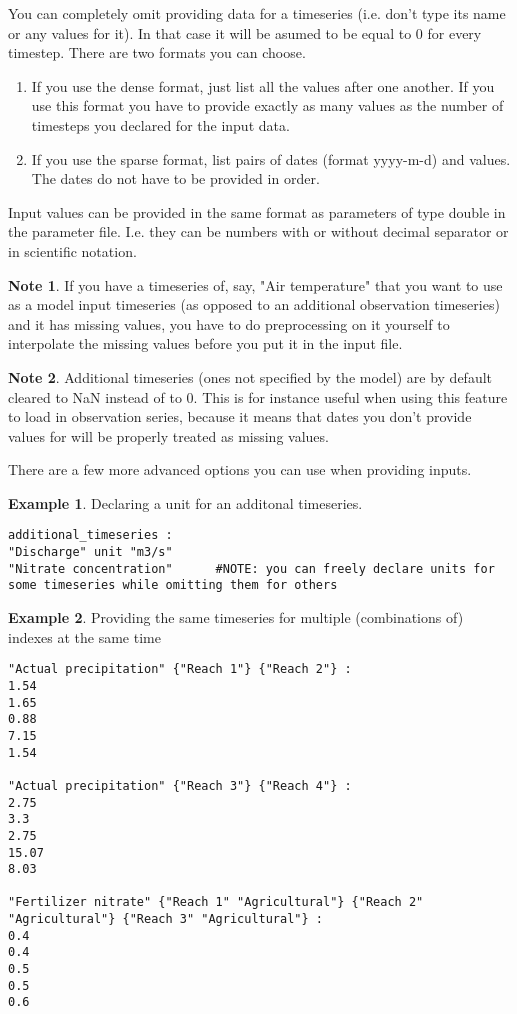 \documentclass[11pt]{article}
\theoremstyle{definition}
\newtheorem{mynote}{Note}
\newenvironment{note}%
  {\begin{lrbox}{\notebox}%
   \begin{minipage}{\dimexpr\linewidth-2\fboxsep}
   \begin{mynote}}%
  {\end{mynote}%
   \end{minipage}%
   \end{lrbox}%
   \begin{trivlist}
     \item[]\colorbox{silver}{\usebox\notebox}
   \end{trivlist}}
\newtheorem{myexample}{Example}
\newenvironment{example}%
  {\begin{lrbox}{\examplebox}%
   \begin{minipage}{\dimexpr\linewidth-2\fboxsep}
   \begin{myexample}}%
  {\end{myexample}%
   \end{minipage}%
   \end{lrbox}%
   \begin{trivlist}
     \item[]\colorbox{silver}{\usebox\examplebox}
   \end{trivlist}}
\begin{document}
You can completely omit providing data for a timeseries (i.e. don't type its name or any values for it). In that case it will be asumed to be equal to 0 for every timestep. There are two formats you can choose.
\begin{enumerate}[i]
\item If you use the dense format, just list all the values after one another. If you use this format you have to provide exactly as many values as the number of timesteps you declared for the input data.
\item If you use the sparse format, list pairs of dates (format yyyy-m-d) and values. The dates do not have to be provided in order.
\end{enumerate}
Input values can be provided in the same format as parameters of type double in the parameter file. I.e. they can be numbers with or without decimal separator or in scientific notation.

\begin{note}
If you have a timeseries of, say, "Air temperature" that you want to use as a model input timeseries (as opposed to an additional observation timeseries) and it has missing values, you have to do preprocessing on it yourself to interpolate the missing values before you put it in the input file.
\end{note}

\begin{note}
Additional timeseries (ones not specified by the model) are by default cleared to NaN instead of to 0. This is for instance useful when using this feature to load in observation series, because it means that dates you don't provide values for will be properly treated as missing values.
\end{note}

There are a few more advanced options you can use when providing inputs.

\begin{example}\label{ex:declarewithunit}
Declaring a unit for an additonal timeseries.
\begin{lstlisting}
additional_timeseries :
"Discharge" unit "m3/s"
"Nitrate concentration"      #NOTE: you can freely declare units for some timeseries while omitting them for others
\end{lstlisting}
\end{example}

\begin{example}\label{ex:multiseries}
Providing the same timeseries for multiple (combinations of) indexes at the same time
\begin{lstlisting}
"Actual precipitation" {"Reach 1"} {"Reach 2"} :
1.54
1.65
0.88
7.15
1.54

"Actual precipitation" {"Reach 3"} {"Reach 4"} :
2.75
3.3
2.75
15.07
8.03

"Fertilizer nitrate" {"Reach 1" "Agricultural"} {"Reach 2" "Agricultural"} {"Reach 3" "Agricultural"} :
0.4
0.4
0.5
0.5
0.6
\end{lstlisting}
\end{example}
\end{document}
